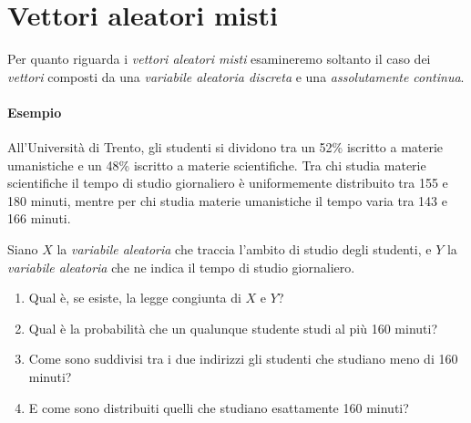 \documentclass[12pt, a4paper]{report}
\theoremstyle{definition}
\begin{document}
\section{Vettori aleatori misti}
Per quanto riguarda i \emph{vettori aleatori misti} esamineremo soltanto il caso
dei \emph{vettori} composti da una \emph{variabile aleatoria discreta} e una
\emph{assolutamente continua}.

\paragraph*{Esempio}
All'Università di Trento, gli studenti si dividono tra un 52\% iscritto a materie
umanistiche e un 48\% iscritto a materie scientifiche.
Tra chi studia materie scientifiche il tempo di studio giornaliero è uniformemente
distribuito tra 155 e 180 minuti, mentre per chi studia materie umanistiche il
tempo varia tra 143 e 166 minuti.

Siano $X$ la \emph{variabile aleatoria} che traccia l'ambito di studio degli
studenti, e $Y$ la \emph{variabile aleatoria} che ne indica il tempo di studio
giornaliero.
\begin{enumerate}
	\item Qual è, se esiste, la legge congiunta di $X$ e $Y$?
	\item Qual è la probabilità che un qualunque studente studi al più 160 minuti?
	\item Come sono suddivisi tra i due indirizzi gli studenti che studiano meno
	di 160 minuti?
	\item E come sono distribuiti quelli che studiano esattamente 160 minuti?
\end{enumerate}
\end{document}
